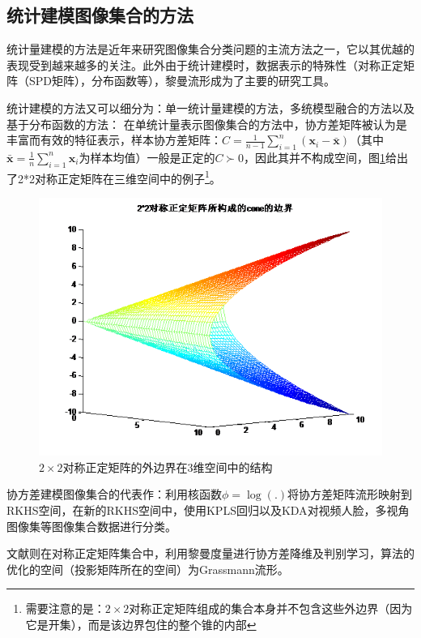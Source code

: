 \subsection{统计建模图像集合的方法}
\label{sec:current_Statistics}
统计量建模的方法是近年来研究图像集合分类问题的主流方法之一，它以其优越的表现受到越来越多的关注。此外由于统计建模时，数据表示的特殊性（对称正定矩阵（SPD矩阵），分布函数等），黎曼流形成为了主要的研究工具。

统计建模的方法又可以细分为：单一统计量建模的方法，多统模型融合的方法以及基于分布函数的方法：
在单统计量表示图像集合的方法中，协方差矩阵被认为是丰富而有效的特征表示，样本协方差矩阵：$C=\frac{1}{n-1}\sum_{i=1}^n (\bm{x}_i-\bar{\bm{x}})$（其中$\bar{\bm{x}}=\frac{1}{n}\sum_{i=1}^n \bm{x}_i$为样本均值）一般是正定的$C \succ 0$，因此其并不构成空间，图\ref{fig:2d_SPD_cone}给出了2*2对称正定矩阵在三维空间中的例子\footnote{需要注意的是：$2\times 2$对称正定矩阵组成的集合本身并不包含这些外边界（因为它是开集），而是该边界包住的整个锥的内部}。
\begin{figure}[h]
	\centering
	\includegraphics[width=0.5\linewidth]{source/2d_SPD_cone.png}
	\caption{$2\times 2$对称正定矩阵的外边界在3维空间中的结构}
	\label{fig:2d_SPD_cone}
\end{figure}

协方差建模图像集合的代表作\cite{Statistics_CDL}：利用核函数$\phi=\log(.)$将协方差矩阵流形映射到RKHS空间，在新的RKHS空间中，使用KPLS\cite{Kernel_KPLS}回归以及KDA\cite{Kernel_KDA}对视频人脸，多视角图像集等图像集合数据进行分类。

文献\cite{Statistics_SPDML}则在对称正定矩阵集合中，利用黎曼度量进行协方差降维及判别学习，算法的优化的空间（投影矩阵所在的空间）为Grassmann流形。

